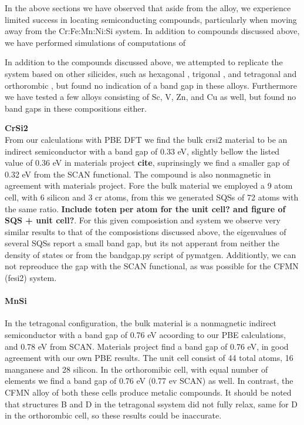 In the above sections we have observed that aside from the  alloy, we experience limited success in locating semiconducting compounds, particularly when moving away from the Cr:Fe:Mn:Ni:Si system. In addition to compounds discussed above, we have performed simulations of computations of

In addition to the compounds discussed above, we attempted to replicate the  system based on other silicides, such as hexagonal , trigonal , and tetragonal and orthorombic , but found no indication of a band gap in these alloys. Furthermore we have tested a few alloys consisting of Sc, V, Zn, and Cu as well, but found no band gaps in these compositions either. 

\textbf{CrSi2 \\}
From our calculations with PBE DFT we find the bulk crsi2 material to be an indirect semiconductor with a band gap of 0.33 eV, slightly bellow the listed value of 0.36 eV in materials project \textbf{cite}, suprinsingly we find a smaller gap of 0.32 eV from the SCAN functional. The compound is also nonmagnetic in agreement with materials project. Fore the bulk material we employed a 9 atom cell, with 6 silicon and 3 cr atoms, from this we generated SQSs of 72 atoms with the same ratio.  \textbf{Include toten per atom for the unit cell? and figure of SQS + unit cell?}. For this given composistion and system we observe very similar results to that of the composistions discussed above, the eigenvalues of several SQSs report a small band gap, but its not apperant from neither the density of states or from the bandgap.py script of pymatgen. Additiontly, we can not repreoduce the gap with the SCAN functional, as was possible for the CFMN (fesi2) system.   

\paragraph{MnSi \\}
In the tetragonal configuration, the bulk material is a nonmagnetic indirect semiconductor with a band gap of 0.76 eV acoording to our PBE calculations,  and 0.78 eV from SCAN. Materials project find a band gap of 0.76 eV, in good agreement with our own PBE results. The unit cell consist of 44 total atoms, 16 manganese and 28 silicon. In the orthoromibic cell, with equal number of elements we find a band gap of 0.76 eV (0.77 ev SCAN) as well. In contrast, the CFMN alloy of both these cells produce metalic compounds. It should be noted that structures B and D in the tetragonal ssystem did not fully relax, same for D in the orthorombic cell, so these results could be inaccurate.   

